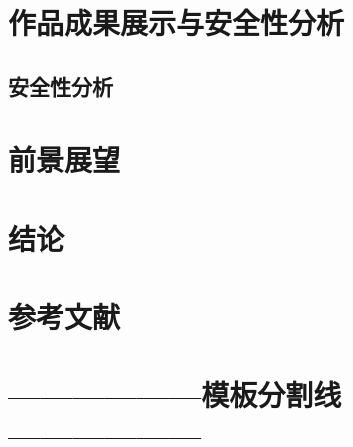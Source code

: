 \documentclass[zihao=-4]{ctexart}
\begin{document}
\section{作品成果展示与安全性分析}
\subsection{安全性分析}

\section{前景展望}

\section{结论}

\section{参考文献}




\section{——————模板分割线——————}
\end{document}
